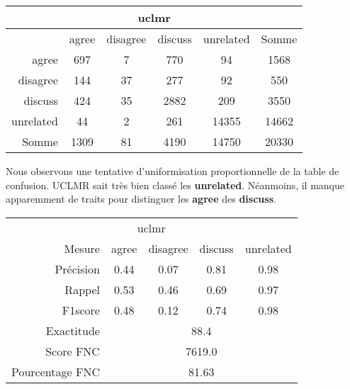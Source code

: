 



\begin{center}
 \begin{tabular}{ r | c c c c | c }
  \multicolumn{6}{c}{uclmr}\\
  \hline
            & agree & disagree & discuss & unrelated & Somme \\
  \hline
  agree     & 697   & 7        & 770     & 94        & 1568  \\
  disagree  & 144   & 37       & 277     & 92        & 550   \\
  discuss   & 424   & 35       & 2882    & 209       & 3550  \\
  unrelated & 44    & 2        & 261     & 14355     & 14662 \\
  \hline
  Somme     & 1309  & 81       & 4190    & 14750     & 20330 \\
 \end{tabular}
\end{center}


Nous observons une tentative d'uniformisation proportionnelle de la table de confusion.
UCLMR sait très bien classé les \textbf{unrelated}. Néanmoins, il manque apparemment de traits pour distinguer les \textbf{agree} des \textbf{discuss}.


\begin{center}
 \begin{tabular}{ r | c c c c }
  \multicolumn{5}{c}{uclmr}\\
  Mesure     & agree & disagree & discuss & unrelated \\
  \hline
  Précision & 0.44  & 0.07     & 0.81    & 0.98      \\
  Rappel     & 0.53  & 0.46     & 0.69    & 0.97      \\
  F1score    & 0.48  & 0.12     & 0.74    & 0.98      \\
  \hline
  \hline
  Exactitude & \multicolumn{4}{c}{88.4}\\
  Score FNC & \multicolumn{4}{c}{7619.0}\\
  Pourcentage FNC & \multicolumn{4}{c}{81.63}\\
 \end{tabular}
\end{center}
